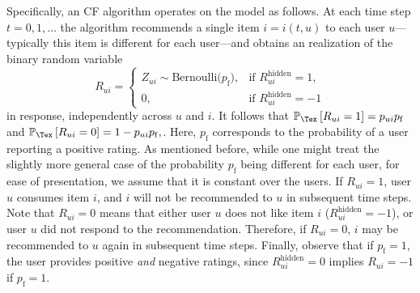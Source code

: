 \documentclass{article}
\newcommand\pf{p_{\mathrm{f}}}
\newcommand\ocrating{R}
\newcommand\ocR{R}
\newcommand\R{R^{\mathrm{hidden}}}
\renewcommand\PR[2][\Tex]{
\ifthenelse{\equal{#1}{}}{{\mathbb P}\left[#2\right]}{\ensuremath{{\mathbb P}_{#1}\left[ #2\right]}}}
\begin{document}
Specifically, an CF algorithm operates on the model as follows. At each time step $t=0,1,\ldots$ the algorithm recommends a single item $i = i(t,u)$ to each user $u$---typically this item is different for each user---and obtains an realization of the binary random variable 
\[
\ocR_{ui} =  
\begin{cases}
Z_{ui} \sim \text{Bernoulli($\pf$)}, & \text{if } \R_{ui}=1,\\
0, & \text{if } \R_{ui} = -1
\end{cases}
\]
in response, independently across $u$ and $i$. 
It follows that 
$
\PR{\ocR_{ui} = 1} = p_{ui} \pf
$
and
$
\PR{\ocR_{ui} = 0} = 1 - p_{ui} \pf,
$. 
Here, $\pf$ corresponds to the probability of a user reporting a positive rating. 
As mentioned before, while one might treat the slightly more general case of the probability $\pf$ being different for each user, for ease of presentation, we assume that it is constant over the users. 
If $\ocR_{ui} = 1$, user $u$ consumes item $i$, and $i$ will not be recommended to $u$ in subsequent time steps. 
Note that $\ocR_{ui}=0$ means that either user $u$ does not like item $i$ ($\R_{ui}=-1$), or user $u$ did not respond to the recommendation. 
Therefore, if $\ocR_{ui}=0$, $i$ may be recommended to $u$ again in subsequent time steps. 
Finally, observe that if $\pf=1$, the user provides positive \emph{and} negative ratings, since $\R_{ui}=0$ implies $\ocR_{ui}=-1$ if $\pf=1$. 
%
%
%
%

\end{document}
